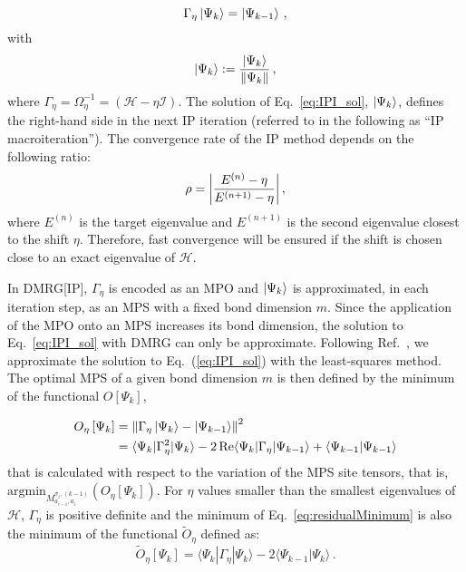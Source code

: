 \documentclass[journal=jctcce]{achemso}
\newcommand{\opr}[1]{\mathcal{#1}}
\begin{document}
\begin{equation}
    \Gamma_\eta \ket{\Psi_{k}} = \ket{\Psi_{k-1}} \, ,
  \label{eq:IPI_sol}
\end{equation}
with
\begin{equation}
                \ket{\Psi_{k}} := \frac{\ket{\Psi_{k}}}{\norm{\Psi_{k}}}\, ,
  \label{eq:IPI_solb}
\end{equation}
%
where $\Gamma_\eta = \Omega_\eta^{-1} = ( \opr{H} - \eta \opr{I}) $.
The solution of Eq.~\eqref{eq:IPI_sol}, $\ket{\Psi_{k}}$, defines the right-hand side in the next IP iteration (referred to in the following as ``IP macroiteration'').
The convergence rate of the IP method depends on the following ratio:\cite{Saad2011_Book}
%
\begin{equation}
  \rho =  \abs{\frac{E^{(n)} - \eta}{E^{(n+1)} - \eta}} \, ,
  \label{eq:ConvergenceRateIPI}
\end{equation}
%
where $E^{(n)}$ is the target eigenvalue and $E^{(n+1)}$ is the second eigenvalue closest to the shift $\eta$.
Therefore, fast convergence will be ensured if the shift is chosen close to an exact eigenvalue of $\opr{H}$. 

\noindent In DMRG[IP], $\Gamma_\eta$ is encoded as an MPO and $\ket{\Psi_{k}}$ is approximated, in each iteration step, as an MPS with a fixed bond dimension $m$.
Since the application of the MPO onto an MPS increases its bond dimension,\cite{Schollwoeck2011_Review-DMRG} the solution to Eq.~\eqref{eq:IPI_sol} with DMRG can only be approximate.
Following Ref.~, we approximate the solution to Eq.~(\ref{eq:IPI_sol}) with the least-squares method.
The optimal MPS of a given bond dimension $m$ is then defined by the minimum of the functional $O[\Psi_{k}]$\cite{Oseledets2012_ALS,Holz2012_ALSTheory},

\begin{equation}
 \begin{aligned}
  O_\eta \left[ \Psi_{k} \right] &= 
    \left\| \Gamma_\eta \ket{\Psi_{k}} - \ket{\Psi_{k-1}} \right\|^2 \\
      &= \langle \Psi_{k} | \Gamma_\eta^2 | \Psi_{k} \rangle 
       - 2 \Re \langle \Psi_{k}| \Gamma_\eta | \Psi_{k-1} \rangle
       + \langle \Psi_{k-1}| \Psi_{k-1} \rangle
 \end{aligned}
 \label{eq:residualMinimum}
\end{equation}
%
that is calculated with respect to the variation of the MPS site tensors, that is, $\text{argmin}_{M_{a_{i-1},a_i}^{\sigma_i,(k-1)}}(O_\eta \left[ \Psi_{k} \right])$.
For $\eta$ values smaller than the smallest eigenvalues of $\mathcal{H}$, $\Gamma_\eta$ is positive definite and the minimum of Eq.~\eqref{eq:residualMinimum} is also the minimum of the functional $\tilde{O}_\eta$ defined as:
\begin{equation}
  \tilde{O}_\eta  \left[ \Psi_{k} \right] = \langle \Psi_{k} | \Gamma_\eta | \Psi_{k} \rangle 
       - 2 \langle \Psi_{k-1} | \Psi_{k} \rangle\, .
 \label{eq:residualMinimum_Equivalent}
\end{equation}
\end{document}
